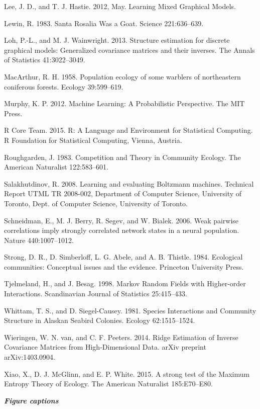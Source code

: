 \documentclass[12pt,]{article}
\begin{document}
\begin{spacing}{1.9}
\begin{flushleft}
Lee, J. D., and T. J. Hastie. 2012, May. Learning Mixed Graphical
Models.

Lewin, R. 1983. Santa Rosalia Was a Goat. Science 221:636--639.

Loh, P.-L., and M. J. Wainwright. 2013. Structure estimation for
discrete graphical models: Generalized covariance matrices and their
inverses. The Annals of Statistics 41:3022--3049.

MacArthur, R. H. 1958. Population ecology of some warblers of
northeastern coniferous forests. Ecology 39:599--619.

Murphy, K. P. 2012. Machine Learning: A Probabilistic Perspective. The
MIT Press.

R Core Team. 2015. R: A Language and Environment for Statistical
Computing. R Foundation for Statistical Computing, Vienna, Austria.

Roughgarden, J. 1983. Competition and Theory in Community Ecology. The
American Naturalist 122:583--601.

Salakhutdinov, R. 2008. Learning and evaluating Boltzmann machines.
Technical Report UTML TR 2008-002, Department of Computer Science,
University of Toronto, Dept. of Computer Science, University of Toronto.

Schneidman, E., M. J. Berry, R. Segev, and W. Bialek. 2006. Weak
pairwise correlations imply strongly correlated network states in a
neural population. Nature 440:1007--1012.

Strong, D. R., D. Simberloff, L. G. Abele, and A. B. Thistle. 1984.
Ecological communities: Conceptual issues and the evidence. Princeton
University Press.

Tjelmeland, H., and J. Besag. 1998. Markov Random Fields with
Higher-order Interactions. Scandinavian Journal of Statistics
25:415--433.

Whittam, T. S., and D. Siegel-Causey. 1981. Species Interactions and
Community Structure in Alaskan Seabird Colonies. Ecology 62:1515--1524.

Wieringen, W. N. van, and C. F. Peeters. 2014. Ridge Estimation of
Inverse Covariance Matrices from High-Dimensional Data. arXiv preprint
arXiv:1403.0904.

Xiao, X., D. J. McGlinn, and E. P. White. 2015. A strong test of the
Maximum Entropy Theory of Ecology. The American Naturalist 185:E70--E80.

\textbf{\emph{Figure captions}}


\end{flushleft}
\end{spacing}
\end{document}
